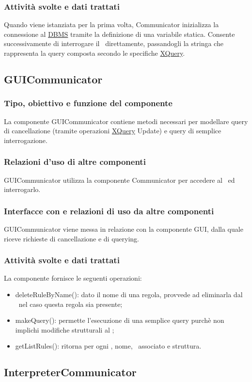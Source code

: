 \subsubsection{Attivit\`a svolte e dati trattati}
Quando viene istanziata per la prima volta, Communicator inizializza la connessione al \underline{DBMS} tramite la definizione di una variabile statica. Consente successivamente di interrogare il \rp\ direttamente, passandogli la stringa che rappresenta la query composta secondo le specifiche \underline{XQuery}.
%
\subsection{GUICommunicator}
\subsubsection{Tipo, obiettivo e funzione del componente}
La componente GUICommunicator contiene metodi necessari per modellare query di cancellazione (tramite operazioni \underline{XQuery} Update) e query di semplice interrogazione.
\subsubsection{Relazioni d'uso di altre componenti}
GUICommunicator utilizza la componente Communicator per accedere al \rp\ ed interrogarlo.
\subsubsection{Interfacce con e relazioni di uso da altre componenti}
GUICommunicator viene messa in relazione con la componente GUI, dalla quale riceve richieste di cancellazione e di querying.
\subsubsection{Attivit\`a svolte e dati trattati}
La componente fornisce le seguenti operazioni:
\begin{itemize}
 \item deleteRuleByName(): dato il nome di una regola, provvede ad eliminarla dal \rp\ nel caso questa regola sia presente;
 \item makeQuery(): permette l'esecuzione di una semplice query purch\`e non implichi modifiche strutturali al \rp;
 \item getListRules(): ritorna per ogni \br, nome, \bo\ associato e struttura.
\end{itemize}
\subsection{InterpreterCommunicator}
